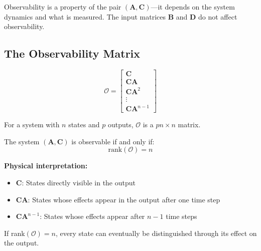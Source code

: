Observability is a property of the pair $(\mathbf{A}, \mathbf{C})$---it depends on the system dynamics and what is measured. The input matrices $\mathbf{B}$ and $\mathbf{D}$ do not affect observability.

\subsection{The Observability Matrix}

\begin{equation}
\boxed{\mathcal{O} = \begin{bmatrix} \mathbf{C} \\ \mathbf{C}\mathbf{A} \\ \mathbf{C}\mathbf{A}^2 \\ \vdots \\ \mathbf{C}\mathbf{A}^{n-1} \end{bmatrix}}
\label{eq:observability_matrix}
\end{equation}

For a system with $n$ states and $p$ outputs, $\mathcal{O}$ is a $pn \times n$ matrix.

\begin{theorem}
\label{thm:observability_rank}
The system $(\mathbf{A}, \mathbf{C})$ is observable if and only if:
\begin{equation}
\text{rank}(\mathcal{O}) = n
\end{equation}
\end{theorem}

\textbf{Physical interpretation:}
\begin{itemize}
    \item $\mathbf{C}$: States directly visible in the output
    \item $\mathbf{C}\mathbf{A}$: States whose effects appear in the output after one time step
    \item $\mathbf{C}\mathbf{A}^{n-1}$: States whose effects appear after $n-1$ time steps
\end{itemize}

If rank$(\mathcal{O}) = n$, every state can eventually be distinguished through its effect on the output.

